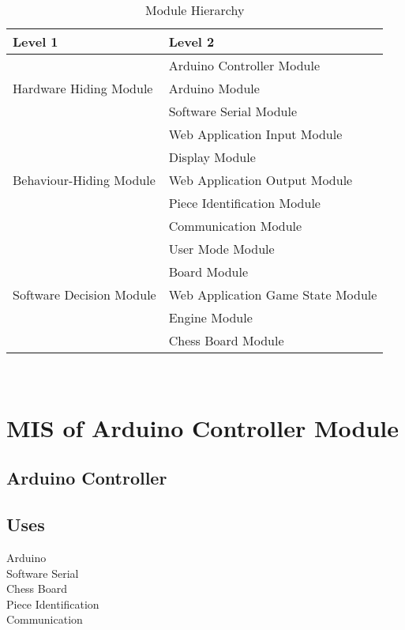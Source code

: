 \documentclass[12pt, titlepage]{article}
\begin{document}
\begin{table}[h!]
\centering
\begin{tabular}{p{} p{}}
\toprule
\textbf{Level 1} & \textbf{Level 2}\\
\midrule


\multirow{3}{0.3\textwidth}{Hardware Hiding Module}
& Arduino Controller Module \\ 
& Arduino Module \\
& Software Serial Module \\
\midrule

\multirow{5}{0.3\textwidth}{Behaviour-Hiding Module} 
& Web Application Input Module\\
& Display Module\\
& Web Application Output Module\\
& Piece Identification Module \\
& Communication Module\\
\midrule

\multirow{5}{0.3\textwidth}{Software Decision Module} 
& User Mode Module\\
& Board Module\\
& Web Application Game State Module\\
& Engine Module\\
& Chess Board Module\\
\bottomrule

\end{tabular}
\caption{Module Hierarchy}
\label{TblMH}
\end{table}

\newpage
~\newpage


\section{MIS of Arduino Controller Module} \label{ArduinoControllerModule}

\subsection{Arduino Controller}

\subsection{Uses}
Arduino\\
Software Serial\\
Chess Board\\
Piece Identification\\
Communication\\
\end{document}
